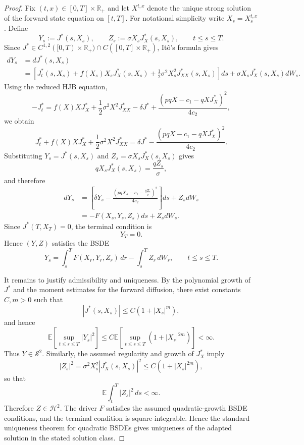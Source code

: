 \documentclass[11pt]{article}
\begin{document}
	\begin{proof}
		Fix $(t,x)\in[0,T]\times\mathbb{R}_{+}$ and let $X^{t,x}$ denote the unique strong solution of the forward state equation on $[t,T]$. For notational simplicity write $X_s=X_s^{t,x}$. Define
		\[
		Y_s:=J^*(s,X_s),
		\qquad
		Z_s:=\sigma X_sJ_X^*(s,X_s),
		\qquad t\le s\le T.
		\]
		Since $J^*\in C^{1,2}([0,T)\times\mathbb{R}_{+})\cap C([0,T]\times\mathbb{R}_{+})$, It\^o's formula gives
		\[
		\begin{aligned}
			dY_s
			&=
			dJ^*(s,X_s) \\
			&=
			\left[
			J_t^*(s,X_s)
			+
			f(X_s)X_sJ_X^*(s,X_s)
			+
			\frac12\sigma^2X_s^2J_{XX}^*(s,X_s)
			\right]ds
			+
			\sigma X_sJ_X^*(s,X_s)dW_s .
		\end{aligned}
		\]
		Using the reduced HJB equation,
		\[
		-
		J_t^*
		=
		f(X)XJ_X^*
		+
		\frac12\sigma^2X^2J_{XX}^*
		-
		\delta J^*
		+
		\frac{(pqX-c_1-qXJ_X^*)^2}{4c_2},
		\]
		we obtain
		\[
		J_t^*
		+
		f(X)XJ_X^*
		+
		\frac12\sigma^2X^2J_{XX}^*
		=
		\delta J^*
		-
		\frac{(pqX-c_1-qXJ_X^*)^2}{4c_2}.
		\]
		Substituting $Y_s=J^*(s,X_s)$ and $Z_s=\sigma X_sJ_X^*(s,X_s)$ gives
		\[
		qX_sJ_X^*(s,X_s)
		=
		\frac{qZ_s}{\sigma},
		\]
		and therefore
		\[
		\begin{aligned}
			dY_s
			&=
			\left[
			\delta Y_s
			-
			\frac{
				\left(
				pqX_s-c_1-\frac{qZ_s}{\sigma}
				\right)^2
			}{4c_2}
			\right]ds
			+
			Z_sdW_s \\
			&=
			-
			F(X_s,Y_s,Z_s)ds+Z_sdW_s .
		\end{aligned}
		\]
		Since $J^*(T,X_T)=0$, the terminal condition is
		\[
		Y_T=0.
		\]
		Hence $(Y,Z)$ satisfies the BSDE
		\[
		Y_s
		=
		\int_s^T
		F(X_r,Y_r,Z_r)\,dr
		-
		\int_s^T Z_r\,dW_r,
		\qquad t\le s\le T.
		\]
		
		It remains to justify admissibility and uniqueness. By the polynomial growth of $J^*$ and the moment estimates for the forward diffusion, there exist constants $C,m>0$ such that
		\[
		|J^*(s,X_s)|\le C(1+|X_s|^m),
		\]
		and hence
		\[
		\mathbb{E}\left[\sup_{t\le s\le T}|Y_s|^2\right]
		\le
		C\mathbb{E}\left[\sup_{t\le s\le T}(1+|X_s|^{2m})\right]
		<\infty.
		\]
		Thus $Y\in\mathcal{S}^2$. Similarly, the assumed regularity and growth of $J_X^*$ imply
		\[
		|Z_s|^2
		=
		\sigma^2X_s^2|J_X^*(s,X_s)|^2
		\le
		C(1+|X_s|^{2m}),
		\]
		so that
		\[
		\mathbb{E}\int_t^T |Z_s|^2\,ds<\infty.
		\]
		Therefore $Z\in\mathcal{H}^2$. The driver $F$ satisfies the assumed quadratic-growth BSDE conditions, and the terminal condition is square-integrable. Hence the standard uniqueness theorem for quadratic BSDEs gives uniqueness of the adapted solution in the stated solution class.
		

\end{proof}
\end{document}

